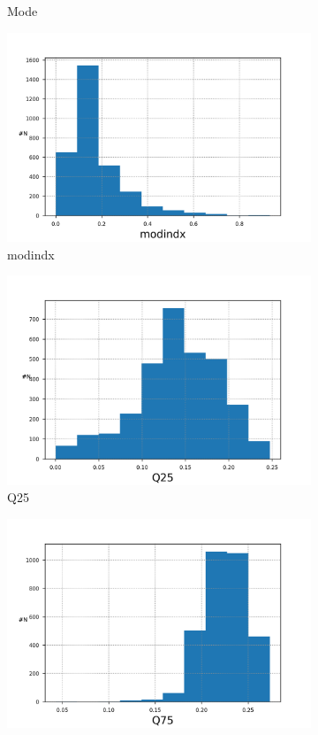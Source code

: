 \documentclass{article}
\begin{document}
\begin{figure}[H]
\begin{subfigure}{.5\textwidth}
                \caption{Mode}
            \end{subfigure}
            \begin{subfigure}{.5\textwidth}
                \centering
                \includegraphics[width=.8\linewidth]{img1/data_histmodindx.png}
                \caption{modindx}
            \end{subfigure}
            \begin{subfigure}{.5\textwidth}
                \centering
                \includegraphics[width=.8\linewidth]{img1/data_histQ25.png}
                \caption{Q25}
            \end{subfigure}
            \begin{subfigure}{.5\textwidth}
                \centering
                \includegraphics[width=.8\linewidth]{img1/data_histQ75.png}

\end{subfigure}
\end{figure}
\end{document}
